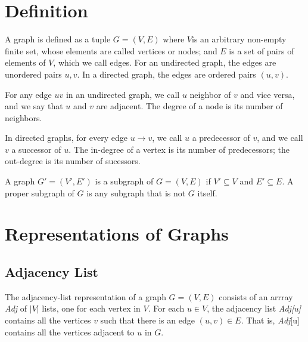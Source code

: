 \section{Definition}

\vspace{\parskip}

\begin{definition}[Graphs]   
    A graph is defined as a tuple $G=(V,E)$ where $V$is an arbitrary non-empty finite set, whose elements are called vertices or nodes; and $E$ is a set of pairs of elements of $V$, which we call edges. For an undirected graph, the edges are unordered pairs ${u,v}$. In a directed graph, the edges are ordered pairs $(u,v)$.
\end{definition}

\begin{definition}      
    For any edge $uv$ in an undirected graph, we call $u$ neighbor of $v$ and vice versa, and we say that $u$ and $v$ are adjacent. The degree of a node is its number of neighbors.

    In directed graphs, for every edge $u \to v$, we call $u$ a predecessor of $v$, and we call $v$ a successor of $u$. The in-degree of a vertex is its number of predecessors; the out-degree is its number of sucessors.
\end{definition}

\begin{definition}[Subgraphs] 
    A graph $G' = (V',E')$ is a subgraph of $G=(V,E)$ if $V' \subseteq V$ and $E' \subseteq E$. A proper subgraph of $G$ is any subgraph that is not $G$ itself.
\end{definition}

\section{Representations of Graphs}

\subsection{Adjacency List}

\vspace{\parskip}

\begin{definition} 
    The adjacency-list representation of a graph $G=(V,E)$ consists of an arrray \textit{Adj} of $|V|$ lists, one for each vertex in $V$. For each $u \in V$, the adjacency list \textit{Adj[u]} contains all the vertices $v$ such that there is an edge $(u,v) \in E$. That is, \textit{Adj}[u] contains all the vertices adjacent to $u$ in $G$.
\end{definition}


